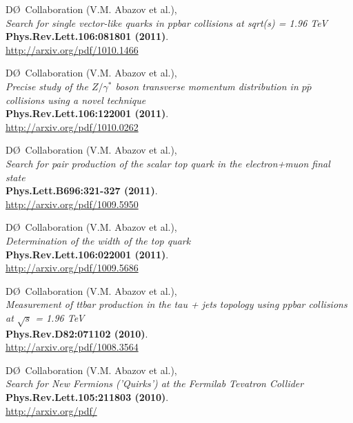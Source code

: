 \documentclass[12pt]{article}
\begin{document}
D\O~Collaboration (V.M. Abazov et al.), \\
\textsl{Search for single vector-like quarks in ppbar collisions at sqrt(s) = 1.96 TeV}\\
\textbf{Phys.Rev.Lett.106:081801 (2011)}.\\
{\small{\url{http://arxiv.org/pdf/1010.1466}}}\vspace{4mm}

D\O~Collaboration (V.M. Abazov et al.), \\
\textsl{Precise study of the $Z/\gamma^*$ boson transverse momentum distribution in $p\bar{p}$ collisions using a novel technique}\\
\textbf{Phys.Rev.Lett.106:122001 (2011)}.\\
{\small{\url{http://arxiv.org/pdf/1010.0262}}}\vspace{4mm}

D\O~Collaboration (V.M. Abazov et al.), \\
\textsl{Search for pair production of the scalar top quark in the electron+muon final state}\\
\textbf{Phys.Lett.B696:321-327 (2011)}.\\
{\small{\url{http://arxiv.org/pdf/1009.5950}}}\vspace{4mm}

D\O~Collaboration (V.M. Abazov et al.), \\
\textsl{Determination of the width of the top quark}\\
\textbf{Phys.Rev.Lett.106:022001 (2011)}.\\
{\small{\url{http://arxiv.org/pdf/1009.5686}}}\vspace{4mm}

D\O~Collaboration (V.M. Abazov et al.), \\
\textsl{Measurement of ttbar production in the tau + jets topology using ppbar collisions at $\sqrt{s}$ = 1.96 TeV}\\
\textbf{Phys.Rev.D82:071102 (2010)}.\\
{\small{\url{http://arxiv.org/pdf/1008.3564}}}\vspace{4mm}

D\O~Collaboration (V.M. Abazov et al.), \\
\textsl{Search for New Fermions ('Quirks') at the Fermilab Tevatron Collider}\\
\textbf{Phys.Rev.Lett.105:211803 (2010)}.\\
{\small{\url{http://arxiv.org/pdf/}}}\vspace{4mm}
\end{document}
